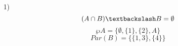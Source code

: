 1)\newline
\begin{equation*}
(A \cap B) \textbackslash B = \emptyset
\end{equation*}
\begin{equation*}
    \wp A = \{ \emptyset,\{1\},\{2\},A\}
\end{equation*}
\begin{equation*}
    Par(B) = \{\{1,3\},\{4\}\}
\end{equation*}
